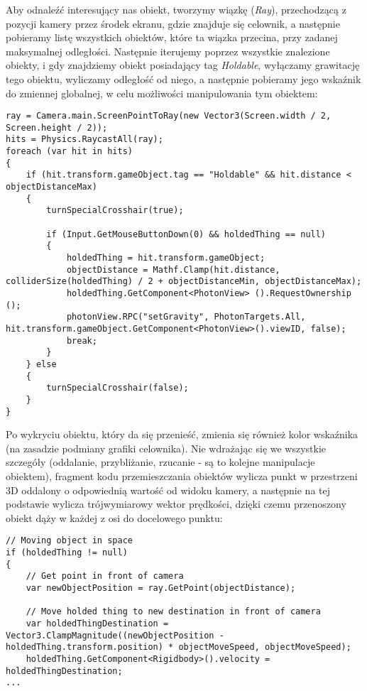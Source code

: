 Aby odnaleźć interesujący nas obiekt, tworzymy wiązkę (\textit{Ray}), przechodzącą z pozycji kamery przez środek ekranu, gdzie znajduje się celownik, a następnie pobieramy listę wszystkich obiektów, które ta wiązka przecina, przy zadanej maksymalnej odległości. Następnie iterujemy poprzez wszystkie znalezione obiekty, i gdy znajdziemy obiekt posiadający tag \textit{Holdable}, wyłączamy grawitację tego obiektu, wyliczamy odległość od niego, a następnie pobieramy jego wskaźnik do zmiennej globalnej, w celu możliwości manipulowania tym obiektem:
\\
\begin{lstlisting}[caption={Algorytm wykrywania obiektów w obrębie Maga, które mogą zostać przeniesione}]
ray = Camera.main.ScreenPointToRay(new Vector3(Screen.width / 2, Screen.height / 2));
hits = Physics.RaycastAll(ray);
foreach (var hit in hits)
{
    if (hit.transform.gameObject.tag == "Holdable" && hit.distance < objectDistanceMax)
    {
        turnSpecialCrosshair(true);

        if (Input.GetMouseButtonDown(0) && holdedThing == null)
        {
            holdedThing = hit.transform.gameObject;
            objectDistance = Mathf.Clamp(hit.distance, colliderSize(holdedThing) / 2 + objectDistanceMin, objectDistanceMax);
            holdedThing.GetComponent<PhotonView> ().RequestOwnership ();
            photonView.RPC("setGravity", PhotonTargets.All, hit.transform.gameObject.GetComponent<PhotonView>().viewID, false);
            break;
        }
    } else
    {
        turnSpecialCrosshair(false);
    }
}
\end{lstlisting}

Po wykryciu obiektu, który da się przenieść, zmienia się również kolor wskaźnika (na zasadzie podmiany grafiki celownika). Nie wdrażając się we wszystkie szczegóły (oddalanie, przybliżanie, rzucanie - są to kolejne manipulacje obiektem), fragment kodu przemieszczania obiektów wylicza punkt w przestrzeni 3D oddalony o odpowiednią wartość od widoku kamery, a następnie na tej podstawie wylicza trójwymiarowy wektor prędkości, dzięki czemu przenoszony obiekt dąży w każdej z osi do docelowego punktu:
\\
\begin{lstlisting}[caption={Algorytm przenoszenia obiektów}]
// Moving object in space
if (holdedThing != null)
{
    // Get point in front of camera
    var newObjectPosition = ray.GetPoint(objectDistance);

    // Move holded thing to new destination in front of camera
    var holdedThingDestination = Vector3.ClampMagnitude((newObjectPosition - holdedThing.transform.position) * objectMoveSpeed, objectMoveSpeed);
    holdedThing.GetComponent<Rigidbody>().velocity = holdedThingDestination;
...
\end{lstlisting}

